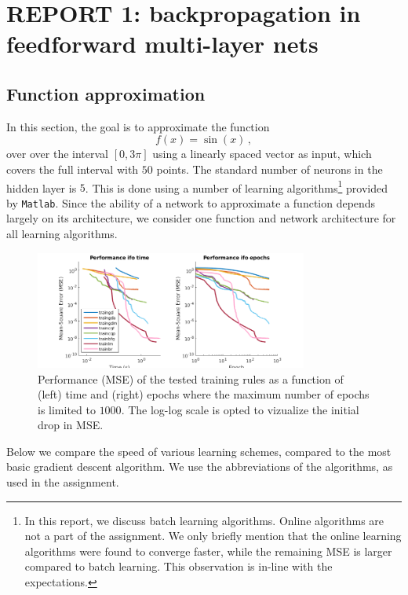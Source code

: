 \documentclass[pdftex,11pt,a4paper]{article}
\begin{document}
\section{REPORT 1: backpropagation in feedforward multi-layer nets}
\subsection{Function approximation}
In this section, the goal is to approximate the function
\begin{equation}\label{eq:myfunction}
f(x) = \sin(x)\,,
\end{equation}
over over the interval $[0,3\pi]$ using a linearly spaced vector as input, which covers the full interval with $50$ points. The standard number of neurons in the hidden layer is $5$. This is done using a number of learning algorithms\footnote{In this report, we discuss batch learning algorithms. Online algorithms are not a part of the assignment. We only briefly mention that the online learning algorithms were found to converge faster, while the remaining MSE is larger compared to batch learning. This observation is in-line with the expectations.} provided by \texttt{Matlab}. Since the ability of a network to approximate a function depends largely on its architecture, we consider one function and network architecture for all learning algorithms.

\begin{figure}[htb]
\centering
\includegraphics[width=0.8\textwidth]{figs/performance_plot.png}
\caption{Performance (MSE) of the tested training rules as a function of (left) time and (right) epochs where the maximum number of epochs is limited to $1000$. The log-log scale is opted to vizualize the initial drop in MSE. \label{fig:performace_plot}}
\end{figure}

Below we compare the speed of various learning schemes, compared to the most basic gradient descent algorithm. We use the abbreviations of the algorithms, as used in the assignment.
\end{document}
